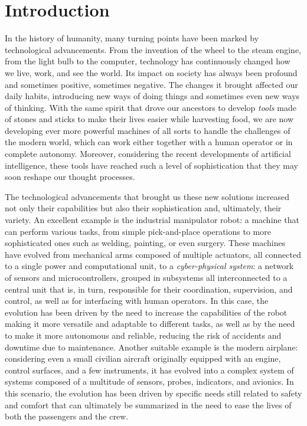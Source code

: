 \chapter{Introduction}
\label{ch:intro}
\vspace{-1.3cm}

In the history of humanity, many turning points have been marked by technological advancements. From the invention of the wheel to the steam engine, from the light bulb to the computer, technology has continuously changed how we live, work, and see the world. Its impact on society has always been profound and sometimes positive, sometimes negative. The changes it brought affected our daily habits, introducing new ways of doing things and sometimes even new ways of thinking. With the same spirit that drove our ancestors to develop \emph{tools} made of stones and sticks to make their lives easier while harvesting food, we are now developing ever more powerful machines of all sorts to handle the challenges of the modern world, which can work either together with a human operator or in complete autonomy. Moreover, considering the recent developments of artificial intelligence, these tools have reached such a level of sophistication that they may soon reshape our thought processes.

The technological advancements that brought us these new solutions increased not only their capabilities but also their sophistication and, ultimately, their variety. An excellent example is the industrial manipulator robot: a machine that can perform various tasks, from simple pick-and-place operations to more sophisticated ones such as welding, painting, or even surgery. These machines have evolved from mechanical arms composed of multiple actuators, all connected to a single power and computational unit, to a \emph{cyber-physical system}: a network of sensors and microcontrollers, grouped in subsystems all interconnected to a central unit that is, in turn, responsible for their coordination, supervision, and control, as well as for interfacing with human operators. In this case, the evolution has been driven by the need to increase the capabilities of the robot making it more versatile and adaptable to different tasks, as well as by the need to make it more autonomous and reliable, reducing the risk of accidents and downtime due to maintenance. Another suitable example is the modern airplane: considering even a small civilian aircraft originally equipped with an engine, control surfaces, and a few instruments, it has evolved into a complex system of systems composed of a multitude of sensors, probes, indicators, and avionics. In this scenario, the evolution has been driven by specific needs still related to safety and comfort that can ultimately be summarized in the need to ease the lives of both the passengers and the crew.

